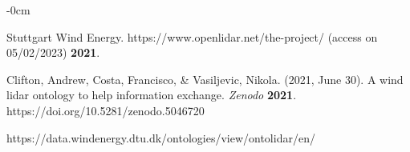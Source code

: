 \documentclass[remotesensing,article,submit,pdftex,moreauthors]{Definitions/mdpi}
\begin{document}
\begin{adjustwidth}{-\extralength}{0cm}
\begin{thebibliography}{999}
Stuttgart Wind Energy. https://www.openlidar.net/the-project/ (access on 05/02/2023) {\bf 2021}.

Clifton, Andrew, Costa, Francisco, & Vasiljevic, Nikola. (2021, June 30). A wind lidar ontology to help information exchange.  {\em Zenodo} {\bf 2021}. https://doi.org/10.5281/zenodo.5046720

 https://data.windenergy.dtu.dk/ontologies/view/ontolidar/en/


\end{thebibliography}

%


\end{adjustwidth}
\end{document}
